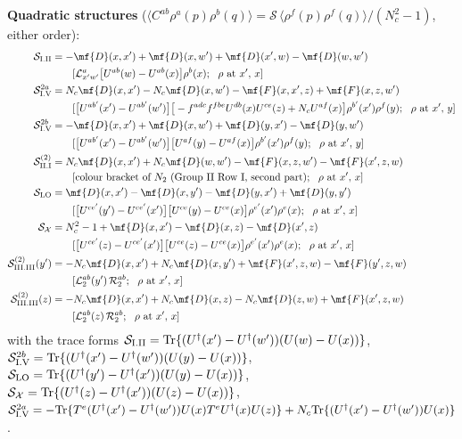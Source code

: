 {\noindent\textbf{Quadratic structures} ($\langle C^{ab}\rho^{a}(p)\rho^{b}(q)\rangle=\mathcal{S}\,\langle\rho^{f}(p)\rho^{f}(q)\rangle/(N_{c}^{2}-1)$, either order):
\begin{align}
\mathcal{S}_{\rm I.II}&=-\mf{D}(x,x')+\mf{D}(x,w')+\mf{D}(x',w)-\mf{D}(w,w')\notag\\&\qquad[\mathcal{L}^{a}_{x'w'}\big[U^{ab}(w)-U^{ab}(x)\big]\rho^{b}(x);\ \ \rho\text{ at }x',\,x]\notag\\
\mathcal{S}_{\rm I.V}^{2a}&=N_{c}\mf{D}(x,x')-N_{c}\mf{D}(x,w')-\mf{F}(x,x',z)+\mf{F}(x,z,w')\notag\\&\qquad[\big[U^{ab'}(x')-U^{ab'}(w')\big]\big[-f^{adc}f^{fbe}U^{db}(x)U^{ce}(z)+N_{c}U^{af}(x)\big]\rho^{b'}(x')\rho^{f}(y);\ \ \rho\text{ at }x',\,y]\notag\\
\mathcal{S}_{\rm I.V}^{2b}&=-\mf{D}(x,x')+\mf{D}(x,w')+\mf{D}(y,x')-\mf{D}(y,w')\notag\\&\qquad[\big[U^{ab'}(x')-U^{ab'}(w')\big]\big[U^{af}(y)-U^{af}(x)\big]\rho^{b'}(x')\rho^{f}(y);\ \ \rho\text{ at }x',\,y]\notag\\
\mathcal{S}_{\rm II.I}^{(2)}&=N_{c}\mf{D}(x,x')+N_{c}\mf{D}(w,w')-\mf{F}(x,z,w')-\mf{F}(x',z,w)\notag\\&\qquad[\text{colour bracket of } N_{2}\text{ (Group II Row I, second part)};\ \ \rho\text{ at }x',\,x]\notag\\
\mathcal{S}_{\rm LO}&=\mf{D}(x,x')-\mf{D}(x,y')-\mf{D}(y,x')+\mf{D}(y,y')\notag\\&\qquad[\big[U^{ce'}(y')-U^{ce'}(x')\big]\big[U^{ce}(y)-U^{ce}(x)\big]\rho^{e'}(x')\rho^{e}(x);\ \ \rho\text{ at }x',\,x]\notag\\
\mathcal{S}_{\mathcal{X}}&=N_{c}^{2}-1+\mf{D}(x,x')-\mf{D}(x,z)-\mf{D}(x',z)\notag\\&\qquad[\big[U^{ce'}(z)-U^{ce'}(x')\big]\big[U^{ce}(z)-U^{ce}(x)\big]\rho^{e'}(x')\rho^{e}(x);\ \ \rho\text{ at }x',\,x]\notag\\
\mathcal{S}_{\rm III.III}^{(2)}(y')&=-N_{c}\mf{D}(x,x')+N_{c}\mf{D}(x,y')+\mf{F}(x',z,w)-\mf{F}(y',z,w)\notag\\&\qquad[\mathcal{L}_{2}^{ab}(y')\,\mathcal{R}_{2}^{ab};\ \ \rho\text{ at }x',\,x]\notag\\
\mathcal{S}_{\rm III.III}^{(2)}(z)&=-N_{c}\mf{D}(x,x')+N_{c}\mf{D}(x,z)-N_{c}\mf{D}(z,w)+\mf{F}(x',z,w)\notag\\&\qquad[\mathcal{L}_{2}^{ab}(z)\,\mathcal{R}_{2}^{ab};\ \ \rho\text{ at }x',\,x]\notag
\end{align}
with the trace forms $\mathcal{S}_{\rm I.II}={\rm Tr}\{(U^{\dagger}(x')-U^{\dagger}(w'))(U(w)-U(x))\}$, $\mathcal{S}_{\rm I.V}^{2b}={\rm Tr}\{(U^{\dagger}(x')-U^{\dagger}(w'))(U(y)-U(x))\}$, $\mathcal{S}_{\rm LO}={\rm Tr}\{(U^{\dagger}(y')-U^{\dagger}(x'))(U(y)-U(x))\}$, $\mathcal{S}_{\mathcal{X}}={\rm Tr}\{(U^{\dagger}(z)-U^{\dagger}(x'))(U(z)-U(x))\}$, $\mathcal{S}^{2a}_{\rm I.V}=-{\rm Tr}\{T^{e}(U^{\dagger}(x')-U^{\dagger}(w'))U(x)T^{e}U^{\dagger}(x)U(z)\}+N_{c}{\rm Tr}\{(U^{\dagger}(x')-U^{\dagger}(w'))U(x)\}$.\par
}
